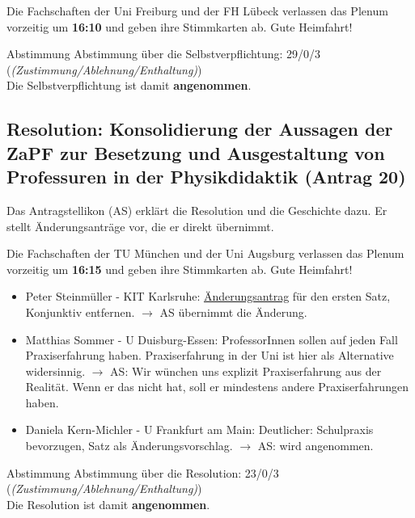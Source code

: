     \begin{info}{}
      Die Fachschaften der Uni Freiburg und der FH Lübeck verlassen das Plenum vorzeitig um \textbf{16:10} und geben ihre Stimmkarten ab. Gute Heimfahrt!
    \end{info}

    \begin{success}{Abstimmung}
      Abstimmung über die Selbstverpflichtung: 29/0/3 (\textit{(Zustimmung/Ablehnung/Enthaltung)}) \\
      Die Selbstverpflichtung ist damit \textbf{angenommen}.
    \end{success}

  \subsection{Resolution: Konsolidierung der Aussagen der ZaPF zur Besetzung und Ausgestaltung von Professuren in der Physikdidaktik (Antrag 20)}
    Das Antragstellikon (AS) erklärt die Resolution und die Geschichte dazu. Er stellt Änderungsanträge vor, die er direkt übernimmt.

    \begin{info}{}
      Die Fachschaften der TU München und der Uni Augsburg verlassen das Plenum vorzeitig um \textbf{16:15} und geben ihre Stimmkarten ab. Gute Heimfahrt!
    \end{info}

    \begin{itemize}
      \item Peter Steinmüller - KIT Karlsruhe:  \underline{Änderungsantrag} für den ersten Satz, Konjunktiv entfernen.
        $\rightarrow$ AS übernimmt die Änderung.
      \item Matthias Sommer - U Duisburg-Essen:  ProfessorInnen sollen auf jeden Fall Praxiserfahrung haben. Praxiserfahrung in der Uni ist hier als Alternative widersinnig.
        $\rightarrow$ AS: Wir wünchen uns explizit Praxiserfahrung aus der Realität. Wenn er das nicht hat, soll er mindestens andere Praxiserfahrungen haben.
      \item Daniela Kern-Michler - U Frankfurt am Main:  Deutlicher: Schulpraxis bevorzugen, Satz als Änderungsvorschlag.
        $\rightarrow$ AS: wird angenommen.
    \end{itemize}

    \begin{success}{Abstimmung}
      Abstimmung über die Resolution: 23/0/3 (\textit{(Zustimmung/Ablehnung/Enthaltung)}) \\
      Die Resolution ist damit \textbf{angenommen}.
    \end{success}

